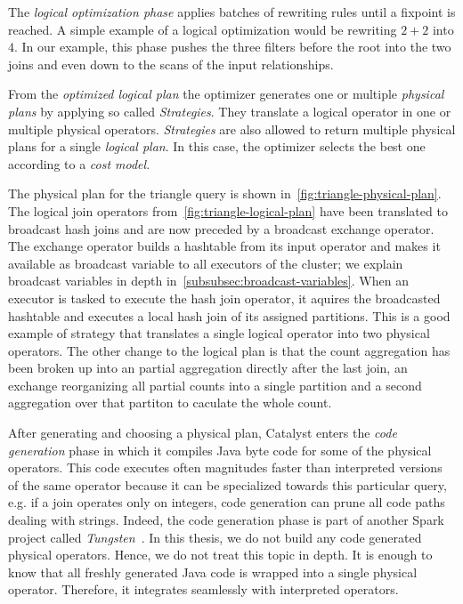 The \textit{logical optimization phase} applies batches of rewriting rules until a fixpoint is reached.
A simple example of a logical optimization would be rewriting $2 + 2$ into $4$.
In our example, this phase pushes the three filters before the root into the two joins and even down to the scans of the input
relationships.

From the \textit{optimized logical plan} the optimizer generates one or multiple \textit{physical plans} by
applying so called \textit{Strategies}.
They translate a logical operator in one or multiple physical operators.
\textit{Strategies} are also allowed to return multiple physical plans for a single \textit{logical plan}.
In this case, the optimizer selects the best one according to a \textit{cost model}.

The physical plan for the triangle query is shown in~\cref{fig:triangle-physical-plan}.
The logical join operators from~\cref{fig:triangle-logical-plan} have been translated to broadcast hash joins and are now preceded by a
broadcast exchange operator.
The exchange operator builds a hashtable from its input operator and makes it available as broadcast variable to all executors of
the cluster; we explain broadcast variables in depth in~\cref{subsubsec:broadcast-variables}.
When an executor is tasked to execute the hash join operator, it aquires the broadcasted hashtable and executes a local hash join
of its assigned partitions.
This is a good example of strategy that translates a single logical operator into two physical operators.
The other change to the logical plan is that the count aggregation has been broken up into an partial aggregation directly after the
last join, an exchange reorganizing all partial counts into a single partition and a second aggregation over that partiton to caculate
the whole count.

After generating and choosing a physical plan, Catalyst enters the \textit{code generation} phase in which it compiles Java byte code for
some of the physical operators.
This code executes often magnitudes faster than interpreted versions~\cite{catalyst} of the same operator because
it can be specialized towards this particular query, e.g. if a join operates only on integers, code
generation can prune all code paths dealing with strings.
Indeed, the code generation phase is part of another Spark project called \textit{Tungsten}~\cite{tungsten}.
In this thesis, we do not build any code generated physical operators.
Hence, we do not treat this topic in depth.
It is enough to know that all freshly generated Java code is wrapped into a single physical operator.
Therefore, it integrates seamlessly with interpreted operators.

